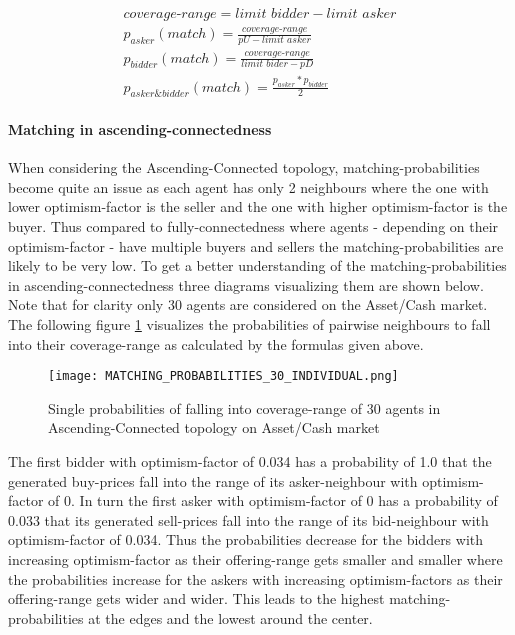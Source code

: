 \documentclass[Bachelorarbeit.tex]{subfiles}
\begin{document}
\begin{equation}
\begin{split}
\textit{coverage-range} = \textit{limit bidder} - \textit{limit asker} \\
p_{asker}(match) = \frac{\textit{coverage-range}}{ pU - \textit{limit asker} } \\
p_{bidder}(match) = \frac{\textit{coverage-range}}{ \textit{limit bider} - pD } \\
p_{asker\&bidder}(match) = \frac{p_{asker} * p_{bidder}}{2}
\end{split}
\end{equation}

\paragraph{Matching in ascending-connectedness}
When considering the Ascending-Connected topology, matching-probabilities become quite an issue as each agent has only 2 neighbours where the one with lower optimism-factor is the seller and the one with higher optimism-factor is the buyer. Thus compared to fully-connectedness where agents - depending on their optimism-factor - have multiple buyers and sellers the matching-probabilities are likely to be very low. To get a better understanding of the matching-probabilities in ascending-connectedness three diagrams visualizing them are shown below. Note that for clarity only 30 agents are considered on the Asset/Cash market.
\medskip
The following figure \ref{fig:MATCHING_PROBABILITIES_30_INDIVIDUAL} visualizes the probabilities of pairwise neighbours to fall into their coverage-range as calculated by the formulas given above.

\begin{figure}[H]
	\centering
  \texttt{[image: MATCHING\_PROBABILITIES\_30\_INDIVIDUAL.png]}
	\caption{Single probabilities of falling into coverage-range of 30 agents in Ascending-Connected topology on Asset/Cash market}
	\label{fig:MATCHING_PROBABILITIES_30_INDIVIDUAL}
\end{figure}

The first bidder with optimism-factor of 0.034 has a probability of 1.0 that the generated buy-prices fall into the range of its asker-neighbour with optimism-factor of 0. In turn the first asker with optimism-factor of 0 has a probability of 0.033 that its generated sell-prices fall into the range of its bid-neighbour with optimism-factor of 0.034. Thus the probabilities decrease for the bidders with increasing optimism-factor as their offering-range gets smaller and smaller where the probabilities increase for the askers with increasing optimism-factors as their offering-range gets wider and wider. This leads to the highest matching-probabilities at the edges and the lowest around the center.
\end{document}
